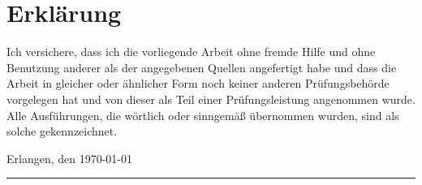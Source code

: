 \chapter*{Erklärung}
Ich versichere, dass ich die vorliegende Arbeit ohne fremde Hilfe und ohne Benutzung anderer als
der angegebenen Quellen angefertigt habe und dass die Arbeit in gleicher oder
ähnlicher Form noch keiner anderen Prüfungsbehörde vorgelegen hat und von dieser
als Teil einer Prüfungsleistung angenommen wurde. Alle Ausführungen, die
wörtlich oder sinngemäß übernommen wurden, sind als solche gekennzeichnet.\\
\vspace{2cm}

Erlangen, den \today\\[-5mm]
\hspace*{9cm}\rule[-0.3pt]{0.35\linewidth}{0.4pt}\\[0mm]
\hspace*{10.4cm}\NAME

\newpage
\thispagestyle{empty}
\mbox{ }
\newpage
